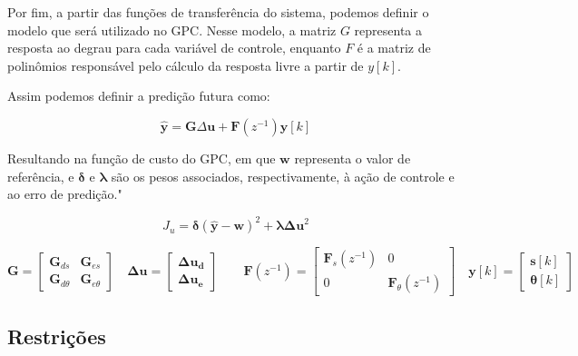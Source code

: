 Por fim, a partir das funções de transferência do sistema,
podemos definir o modelo que será utilizado no GPC.
Nesse modelo, a matriz $G$ representa a resposta ao degrau para cada variável de controle,
enquanto $F$ é a matriz de polinômios responsável pelo cálculo da
resposta livre a partir de $y[k]$.

Assim podemos definir a predição futura como: 

\begin{equation}
\hat{\mathbf{y}} = \mathbf{G} \Delta \mathbf{u} + \mathbf{F}(z^{-1}) \mathbf{y}[k]
\end{equation}

Resultando na função de custo do GPC, em que $\mathbf{w}$ representa o valor de 
referência, e $\boldsymbol{\delta}$ e $\boldsymbol{\lambda}$ são os pesos associados, 
respectivamente, à ação de controle e ao erro de predição."

\begin{equation}
J_u = \boldsymbol{\delta} (\hat{\mathbf{y}} - \mathbf{w})^2 + \boldsymbol{\lambda} \mathbf{\Delta u}^2
\end{equation}

\[
\mathbf{G} = 
\begin{bmatrix}
\mathbf{G}_{d s} & \mathbf{G}_{e s}\\
\mathbf{G}_{d \theta}  & \mathbf{G}_{e \theta}
\end{bmatrix}
\quad
\mathbf{\Delta u} =
\begin{bmatrix}
\mathbf{\Delta u_d} \\
\mathbf{\Delta u_e}
\end{bmatrix}
\qquad
\mathbf{F}(z^{-1}) =
\begin{bmatrix}
\mathbf{F}_{s}(z^{-1}) & 0
\\
0 & \mathbf{F}_{\theta}(z^{-1})
\end{bmatrix}
\quad
\mathbf{y}[k] =
\begin{bmatrix}
\mathbf{s}[k] \\
\mathbf{\theta}[k]
\end{bmatrix}
\]

\subsection{Restrições}